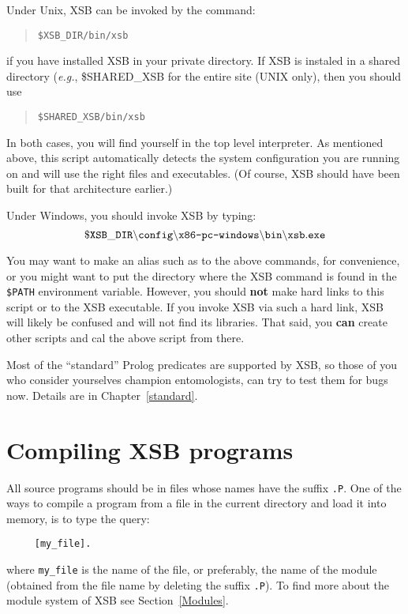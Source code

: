 Under Unix, XSB can be invoked by the command:
\begin{quote}
       \tt \$XSB\_DIR/bin/xsb
\end{quote}
if you have installed XSB in your private directory.
If XSB is instaled in a shared directory ({\it e.g.}, \$SHARED\_XSB
for the entire site (UNIX only), then you should use
\begin{quote}
       \tt \$SHARED\_XSB/bin/xsb
\end{quote}
In both cases, you will find yourself in the top level interpreter.  
As mentioned above, this script automatically detects the system
configuration you are running on and will use the right files and
executables. (Of course, XSB should have been built for that architecture
earlier.)

Under Windows, you should invoke XSB by typing:
\[
 \tt
 \$XSB\_DIR\backslash config\backslash \mbox{\tt x86-pc-windows}\backslash bin
 \backslash xsb.exe
\]


You may want to make an alias such as {\tt \smallourprolog} to the above
commands, for convenience, or you might want to put the directory where the
XSB command is found in the {\tt \$PATH} environment variable. However, you
should {\bf not} make hard links to this script or to the XSB executable.
If you invoke XSB via such a hard link, XSB will likely be confused and will
not find its libraries.  That said, you {\bf can} create other scripts and
cal the above script from there.

Most of the ``standard'' Prolog predicates are supported by XSB, 
so those of you who consider yourselves champion entomologists, can try
to test them for bugs now.  Details are in Chapter~\ref{standard}.


\section{Compiling XSB programs}

All source programs should be in files whose names have the 
suffix {\tt .P}.  One of the ways to compile a program from a file in 
the current directory and load it into memory, is to type the query:
\begin{verbatim}
     [my_file].
\end{verbatim}
where \verb'my_file' is the name of the file, or preferably, the name
of the module (obtained from the file name by deleting the suffix {\tt .P}).
To find more about the module system of XSB see Section~\ref{Modules}.

